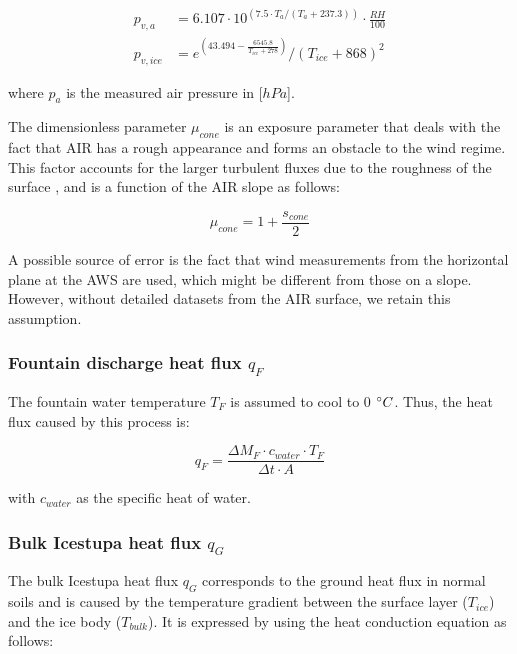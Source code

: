 \documentclass[utf8]{frontiersSCNS} %
\begin{document}
\begin{equation}
	\begin{split}
		p_{v,a}&=6.107 \cdot 10^{(7.5 \cdot T_a / (T_a + 237.3))} \cdot \frac{RH}{100}\\
		p_{v,ice}&=e^{(43.494 - \frac{6545.8}{T_{ice} + 278})}/(T_{ice} + 868)^2
	\end{split} \label{eqn:vp}
\end{equation}

where $p_{a}$ is the measured air pressure in [$hPa$].

The dimensionless parameter $\mu_{cone}$ is an exposure parameter that deals with the fact that AIR has a rough
appearance and forms an obstacle to the wind regime. This factor accounts for the larger turbulent fluxes due to
the roughness of the surface \citep{Oerlemans_2021}, and is a function of the AIR slope as follows:

\begin{equation}
	\mu_{cone} = 1 + \frac{s_{cone}}{2}
\end{equation}

A possible source of error is the fact that wind measurements from the horizontal plane at the AWS are used, which might
be different from those on a slope. However, without detailed datasets from the AIR surface, we retain this assumption.

\subsubsection{Fountain discharge heat flux \texorpdfstring{$q_{F}$}{Lg} }

The fountain water temperature $T_F$ is assumed to cool to 0 $\degree C$. Thus, the heat flux caused by this process is:

\begin{equation}
	q_{F} = \frac{ \Delta M_F \cdot c_{water} \cdot T_F}{\Delta t \cdot A}
	\label{eqn:qF}
\end{equation}

with $c_{water}$ as the specific heat of water.

\subsubsection{Bulk Icestupa heat flux \texorpdfstring{$q_{G}$}{Lg}} \label{sec:Bulkflux}

The bulk Icestupa heat flux $q_{G}$ corresponds to the ground heat flux in normal soils and is caused by the temperature
gradient between the surface layer ($T_{ice}$) and the ice body ($T_{bulk}$). It is expressed by using the heat
conduction equation as follows:
\end{document}

